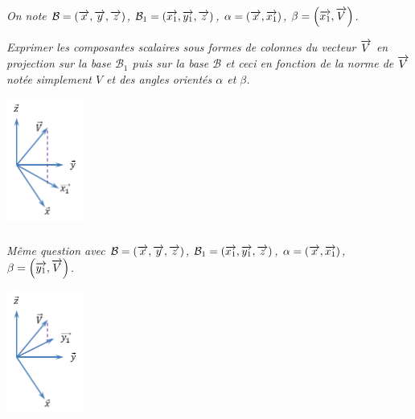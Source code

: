 \documentclass[11pt,oneside]{article}
\begin{document}
\begin{minipage}[c]{.7\linewidth}
\subparagraph{}
\textit{On note $\mathcal{B}=(\overrightarrow{x},\overrightarrow{y},\overrightarrow{z})$, $\mathcal{B}_1=(\overrightarrow{x_1},\overrightarrow{y_1},\overrightarrow{z})$,  $\alpha=\left(\overrightarrow{x},\overrightarrow{x_1}\right)$, $\beta=\left(\overrightarrow{x_1},\overrightarrow{V} \right)$.}

\textit{Exprimer les composantes scalaires sous formes de colonnes du vecteur $\overrightarrow{V}$ en projection sur la base $\mathcal{B}_1$ puis sur la base $\mathcal{B}$ et ceci en fonction de la norme de $\overrightarrow{V}$ notée simplement $V$ et des angles orientés $\alpha$ et $\beta$. }
\end{minipage} \hfill
\begin{minipage}[c]{.29\linewidth}
\begin{center}
\includegraphics[height=4cm]{png/exo4_1}
\end{center}
\end{minipage}



\begin{minipage}[c]{.7\linewidth}
\subparagraph{}
\textit{Même question avec $\mathcal{B}=(\overrightarrow{x},\overrightarrow{y},\overrightarrow{z})$, $\mathcal{B}_1=(\overrightarrow{x_1},\overrightarrow{y_1},\overrightarrow{z})$,  $\alpha=\left(\overrightarrow{x},\overrightarrow{x_1}\right)$, $\beta=\left(\overrightarrow{y_1},\overrightarrow{V} \right)$.}
\end{minipage} \hfill
\begin{minipage}[c]{.29\linewidth}
\begin{center}
\includegraphics[height=4cm]{png/exo4_2}
\end{center}
\end{minipage}
\end{document}

